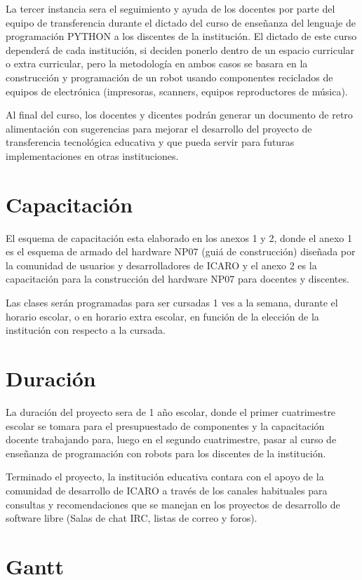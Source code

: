 La tercer instancia sera el seguimiento y ayuda de los docentes por parte del equipo de transferencia durante el dictado del curso de enseñanza del lenguaje de programación PYTHON a los discentes de la institución. El dictado de este curso dependerá de cada institución, si deciden ponerlo dentro de un espacio curricular o extra curricular, pero la metodología en ambos casos se basara en la construcción y programación de un robot usando componentes reciclados de equipos de electrónica (impresoras, scanners, equipos reproductores de música).

Al final del curso, los docentes y dicentes podrán generar un documento de retro alimentación con sugerencias para mejorar el desarrollo del proyecto de transferencia tecnológica educativa y que pueda servir para futuras implementaciones en otras instituciones.

\section{Capacitación}

El esquema de capacitación esta elaborado en los anexos 1 y 2, donde el anexo 1 es el esquema de armado del hardware NP07 (guiá de construcción) diseñada por la comunidad de usuarios y desarrolladores de ICARO y el anexo 2 es la capacitación para la construcción del hardware NP07 para docentes y discentes.

Las clases serán programadas para ser cursadas 1 ves a la semana, durante el horario escolar, o en horario extra escolar, en función de la elección de la institución con respecto a la cursada.

\section{Duración}

La duración del proyecto sera de 1 año escolar, donde el primer cuatrimestre escolar se tomara para el presupuestado de componentes y la capacitación docente trabajando para, luego en el segundo cuatrimestre, pasar al curso de enseñanza de programación con robots para los discentes de la institución.

Terminado el proyecto, la institución educativa contara con el apoyo de la comunidad de desarrollo de ICARO a través de los canales habituales para consultas y recomendaciones que se manejan en los proyectos de desarrollo de software libre (Salas de chat IRC, listas de correo y foros).

\section{Gantt}

